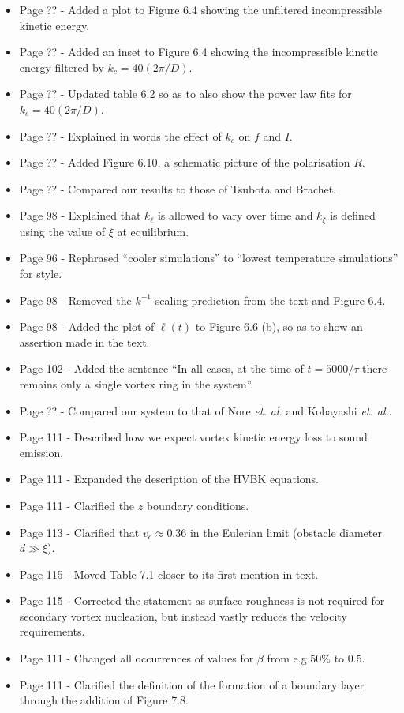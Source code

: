 \documentclass{article}
\begin{document}
\begin{itemize}
\item Page ?? - Added a plot to Figure 6.4 showing the unfiltered incompressible kinetic energy.
\item Page ?? - Added an inset to Figure 6.4 showing the incompressible kinetic energy filtered by $k_c=40 (2\pi/D)$.
\item Page ?? - Updated table 6.2 so as to also show the power law fits for $k_c = 40 (2\pi/D)$.
\item Page ?? - Explained in words the effect of $k_c$ on $f$ and $I$.
\item Page ?? - Added Figure 6.10, a schematic picture of the polarisation $R$.
\item Page ?? - Compared our results to those of Tsubota and Brachet.
\item Page 98 - Explained that $k_\ell$ is allowed to vary over time and $k_\xi$ is defined using the value of $\xi$ at equilibrium.
\item Page 96 - Rephrased ``cooler simulations'' to ``lowest temperature simulations'' for style.
\item Page 98 - Removed the $k^{-1}$ scaling prediction from the text and Figure 6.4.
\item Page 98 - Added the plot of $\ell(t)$ to Figure 6.6 (b), so as to show an assertion made in the text.
\item Page 102 - Added the sentence ``In all cases, at the time of $t=5000/\tau$ there remains only a single vortex ring in the system''.
\item Page ?? - Compared our system to that of Nore {\it et. al.} and Kobayashi {\it et. al.}.
\item Page 111 - Described how we expect vortex kinetic energy loss to sound emission.
\item Page 111 - Expanded the description of the HVBK equations.
\item Page 111 - Clarified the $z$ boundary conditions.
\item Page 113 - Clarified that $v_c \approx 0.36$ in the Eulerian limit (obstacle diameter $d \gg \xi$).
\item Page 115 - Moved Table 7.1 closer to its first mention in text.
\item Page 115 - Corrected the statement as surface roughness is not required for secondary vortex nucleation, but instead vastly reduces the velocity requirements.
\item Page 111 - Changed all occurrences of values for $\beta$ from e.g $50\%$ to $0.5$.
\item Page 111 - Clarified the definition of the formation of a boundary layer through the addition of Figure 7.8.

\end{itemize}
\end{document}
